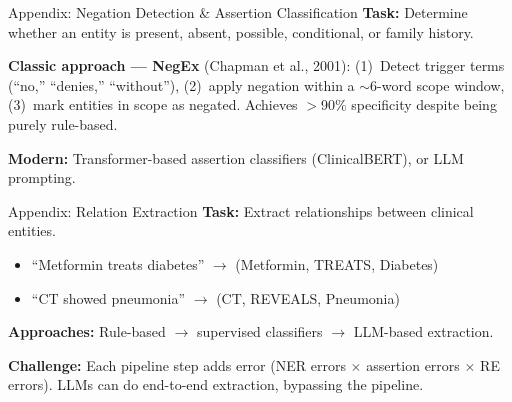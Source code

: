 \documentclass[aspectratio=169,11pt]{beamer}
\begin{document}
\begin{frame}{Appendix: Negation Detection \& Assertion Classification}
\textbf{Task:} Determine whether an entity is present, absent, possible, conditional, or family history.

\vspace{0.2em}
\textbf{Classic approach --- NegEx} (Chapman et al., 2001):
(1)~Detect trigger terms (``no,'' ``denies,'' ``without''),
(2)~apply negation within a $\sim$6-word scope window,
(3)~mark entities in scope as negated.
Achieves $>$90\% specificity despite being purely rule-based.

\vspace{0.2em}
\textbf{Modern:} Transformer-based assertion classifiers (ClinicalBERT), or LLM prompting.
\end{frame}

\begin{frame}{Appendix: Relation Extraction}
\textbf{Task:} Extract relationships between clinical entities.
\begin{itemize}\setlength\itemsep{0.05em}
  \item ``Metformin treats diabetes'' $\rightarrow$ (Metformin, TREATS, Diabetes)
  \item ``CT showed pneumonia'' $\rightarrow$ (CT, REVEALS, Pneumonia)
\end{itemize}

\vspace{0.3em}
\textbf{Approaches:} Rule-based $\rightarrow$ supervised classifiers $\rightarrow$ LLM-based extraction.

\vspace{0.3em}
\textbf{Challenge:} Each pipeline step adds error (NER errors $\times$ assertion errors $\times$ RE errors). LLMs can do end-to-end extraction, bypassing the pipeline.
\end{frame}
\end{document}
